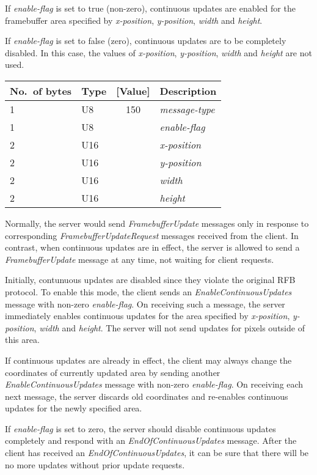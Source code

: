 \documentclass[a4paper]{article}
\newcommand{\typestr}[1]{\textit{#1}}
\begin{document}
If \typestr{enable-flag} is set to true (non-zero), continuous updates
are enabled for the framebuffer area specified by
\typestr{x-position}, \typestr{y-position}, \typestr{width} and
\typestr{height}.

If \typestr{enable-flag} is set to false (zero), continuous updates
are to be completely disabled. In this case, the values of
\typestr{x-position}, \typestr{y-position}, \typestr{width} and
\typestr{height} are not used.

\begin{tabular}{l|lc|l} \hline
No.\ of bytes & Type & [Value] & Description \\ \hline
1 & U8  & 150 & \typestr{message-type} \\
1 & U8  &     & \typestr{enable-flag} \\
2 & U16 &     & \typestr{x-position} \\
2 & U16 &     & \typestr{y-position} \\
2 & U16 &     & \typestr{width} \\
2 & U16 &     & \typestr{height} \\
\hline\end{tabular}

Normally, the server would send \typestr{FramebufferUpdate} messages
only in response to corresponding \typestr{FramebufferUpdateRequest}
messages received from the client. In contrast, when continuous
updates are in effect, the server is allowed to send a
\typestr{FramebufferUpdate} message at any time, not waiting for
client requests.

Initially, contunuous updates are disabled since they violate the
original RFB protocol. To enable this mode, the client sends an
\typestr{EnableContinuousUpdates} message with non-zero
\typestr{enable-flag}. On receiving such a message, the server
immediately enables continuous updates for the area specified by
\typestr{x-position}, \typestr{y-position}, \typestr{width} and
\typestr{height}. The server will not send updates for pixels outside
of this area.

If continuous updates are already in effect, the client may always
change the coordinates of currently updated area by sending another
\typestr{EnableContinuousUpdates} message with non-zero
\typestr{enable-flag}. On receiving each next message, the server
discards old coordinates and re-enables continuous updates for the
newly specified area.

If \typestr{enable-flag} is set to zero, the server should disable
continuous updates completely and respond with an
\typestr{EndOfContinuousUpdates} message. After the client has
received an \typestr{EndOfContinuousUpdates}, it can be sure that
there will be no more updates without prior update requests.
\end{document}
